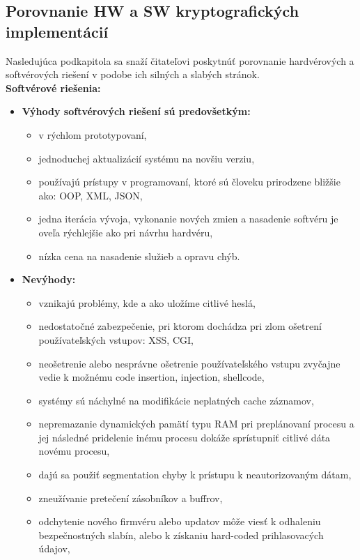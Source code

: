 \documentclass[12pt,a4wide,oneside,openright]{report}
\begin{document}
\subsection{Porovnanie HW a SW kryptografických implementácií} \label{s_cpyt_comparison}
Nasledujúca podkapitola sa snaží čitateľovi poskytnúť porovnanie hardvérových a softvérových riešení v podobe ich silných a slabých stránok. \\
\textbf{Softvérové riešenia:}
	\begin{itemize}
		\item \textbf{Výhody softvérových riešení sú predovšetkým:}
		\begin{itemize}
			\item v rýchlom prototypovaní,
			\item jednoduchej aktualizácií systému na novšiu verziu,
			\item používajú prístupy v programovaní, ktoré sú človeku prirodzene bližšie ako: OOP, XML, JSON,
			\item jedna iterácia vývoja, vykonanie nových zmien a nasadenie softvéru je oveľa rýchlejšie ako pri návrhu hardvéru,
			\item nízka cena na nasadenie služieb a opravu chýb.
		\end{itemize}
		\item \textbf{Nevýhody:}
		\begin{itemize}
			\item vznikajú problémy, kde a ako uložíme citlivé heslá,
			\item nedostatočné zabezpečenie, pri ktorom dochádza pri zlom ošetrení používateľských vstupov: XSS, CGI, 
			\item neošetrenie alebo nesprávne ošetrenie používateľského vstupu zvyčajne vedie k možnému code insertion, injection, shellcode,
			\item systémy sú náchylné na modifikácie neplatných cache záznamov,
			\item nepremazanie dynamických pamätí typu RAM pri preplánovaní procesu a jej následné pridelenie inému procesu dokáže sprístupniť citlivé dáta novému procesu,
			\item dajú sa použiť segmentation chyby k prístupu k neautorizovaným dátam,
			\item zneužívanie pretečení zásobníkov a buffrov,
			\item odchytenie nového firmvéru alebo updatov môže viesť k odhaleniu bezpečnostných slabín, alebo k získaniu hard-coded prihlasovacých údajov,

\end{itemize}
\end{itemize}
\end{document}
